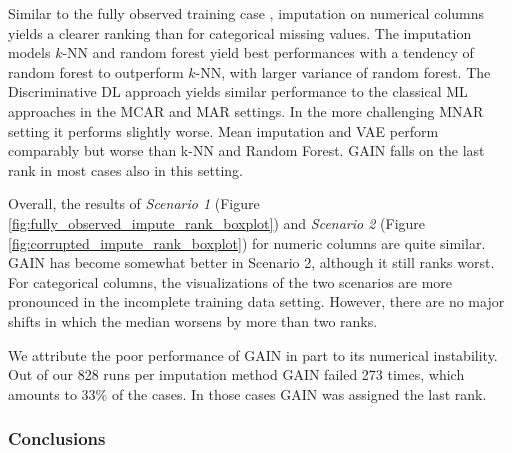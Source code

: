 Similar to the fully observed training case , imputation on numerical columns yields a clearer ranking than for categorical missing values. The imputation models $k$-NN and random forest yield best performances with a tendency of random forest to outperform $k$-NN, with larger variance of random forest. The Discriminative DL approach yields similar performance to the classical ML approaches in the MCAR and MAR settings. In the more challenging MNAR setting it performs slightly worse. Mean imputation and VAE perform comparably but worse than k-NN and Random Forest. GAIN falls on the last rank in most cases also in this setting.

Overall, the results of \textit{Scenario 1} (Figure \ref{fig:fully_observed_impute_rank_boxplot}) and \textit{Scenario 2} (Figure \ref{fig:corrupted_impute_rank_boxplot}) for numeric columns are quite similar. GAIN has become somewhat better in Scenario 2, although it still ranks worst. For categorical columns, the visualizations of the two scenarios are more pronounced in the incomplete training data setting. However, there are no major shifts in which the median worsens by more than two ranks. 

We attribute the poor performance of GAIN in part to its numerical instability. Out of our 828 runs per imputation method GAIN failed 273 times, which amounts to 33\% of the cases. In those cases GAIN was assigned the last rank. 

\subsubsection{Conclusions}

